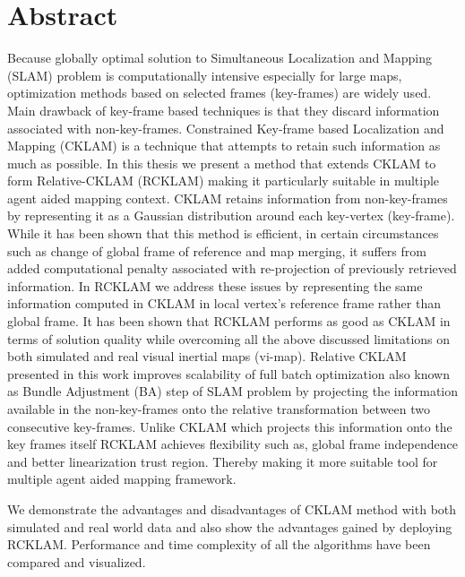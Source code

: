 \chapter*{Abstract}

Because globally optimal solution to Simultaneous Localization and Mapping (SLAM) problem is computationally intensive especially for large maps, optimization methods based on selected frames (key-frames) are widely used. Main drawback of key-frame based techniques is that they discard information associated with non-key-frames. Constrained Key-frame based Localization and Mapping (CKLAM) is a technique that attempts to retain such information as much as possible. In this thesis we present a method that extends CKLAM to form Relative-CKLAM (RCKLAM) making it particularly suitable in multiple agent aided mapping context. CKLAM retains information from non-key-frames by representing it as a Gaussian distribution around each key-vertex (key-frame). While it has been shown that this method is efficient, in certain circumstances such as change of global frame of reference and map merging, it suffers from added computational penalty associated with re-projection of previously retrieved information. In RCKLAM we address these issues by representing the same information computed in CKLAM in local vertex's reference frame rather than global frame. It has been shown that RCKLAM performs as good as CKLAM in terms of solution quality while overcoming all the above discussed limitations on both simulated and real visual inertial maps (vi-map). Relative CKLAM presented in this work improves scalability of full batch optimization also known as Bundle Adjustment (BA) step of SLAM problem by projecting the information available in the non-key-frames onto the relative transformation between two consecutive key-frames. Unlike CKLAM which projects this information onto the key frames itself RCKLAM achieves flexibility such as, global frame independence and better linearization trust region. Thereby making it more suitable tool for multiple agent aided mapping framework.

We demonstrate the advantages and disadvantages of CKLAM method with both simulated and real world data and also show the advantages gained by deploying RCKLAM. Performance and time complexity of all the algorithms have been compared and visualized. 